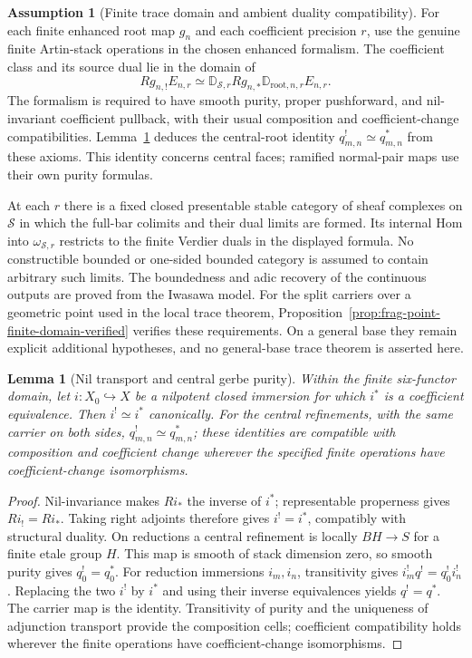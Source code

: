 \documentclass[11pt]{article}
\newtheorem{lemma}[theorem]{Lemma}
\theoremstyle{definition}
\newtheorem{assumption}[theorem]{Assumption}
\theoremstyle{remark}
\begin{document}
\begin{assumption}[Finite trace domain and ambient duality compatibility]
\label{ass:frag-finite-trace-domain}
For each finite enhanced root map $g_n$ and each coefficient precision $r$,
use the genuine finite Artin-stack operations in the chosen enhanced
formalism.  The coefficient class and its source dual lie in the domain of
\[
Rg_{n,!}E_{n,r}\simeq
\mathbb D_{\mathscr S,r}Rg_{n,*}\mathbb D_{\mathrm{root},n,r}E_{n,r}.
\]
The formalism is required to have smooth purity, proper pushforward, and
nil-invariant coefficient pullback, with their usual composition and
coefficient-change compatibilities.  Lemma~\ref{lem:frag-central-refinement-purity}
deduces the central-root identity $q_{m,n}^!\simeq q_{m,n}^*$ from these
axioms.  This identity concerns central faces; ramified normal-pair maps use
their own purity formulas.

At each $r$ there is a fixed closed presentable stable category of sheaf
complexes on $\mathscr S$ in which the full-bar colimits and their dual limits
are formed.  Its internal Hom into $\omega_{\mathscr S,r}$ restricts to the
finite Verdier duals in the displayed formula.  No constructible bounded or
one-sided bounded category is assumed to contain arbitrary such limits.
The boundedness and adic recovery of the continuous outputs are proved from
the Iwasawa model.  For the split carriers over a geometric point used in the local trace
theorem, Proposition~\ref{prop:frag-point-finite-domain-verified}
verifies these requirements.  On a general base they remain explicit
additional hypotheses, and no general-base trace theorem is asserted here.
\end{assumption}

\begin{lemma}[Nil transport and central gerbe purity]
\label{lem:frag-central-refinement-purity}
Within the finite six-functor domain, let $i:X_0\hookrightarrow X$ be a
nilpotent closed immersion for which $i^*$ is a coefficient equivalence.
Then $i^!\simeq i^*$ canonically.  For the central refinements, with the
same carrier on both sides, $q_{m,n}^!\simeq q_{m,n}^*$; these identities
are compatible with composition and coefficient change wherever the
specified finite operations have coefficient-change isomorphisms.
\end{lemma}

\begin{proof}
Nil-invariance makes $Ri_*$ the inverse of $i^*$; representable
properness gives $Ri_!=Ri_*$.  Taking right adjoints therefore gives
$i^!=i^*$, compatibly with structural duality.
On reductions a central refinement is locally $BH\to S$ for a finite
etale group $H$.  This map is smooth of stack dimension zero, so
smooth purity gives $q_0^!=q_0^*$.  For reduction immersions $i_m,i_n$,
transitivity gives $i_m^!q^!=q_0^!i_n^!$.  Replacing the two $i^!$ by
$i^*$ and using their inverse equivalences yields $q^!=q^*$.
The carrier map is the identity.  Transitivity of purity and the
uniqueness of adjunction transport provide the composition cells;
coefficient compatibility holds wherever the finite operations have
coefficient-change isomorphisms.
\end{proof}
\end{document}
